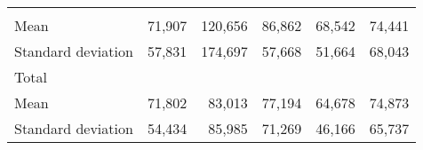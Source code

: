 \begin{tabular}{llllll}
  \multicolumn{1}{|r}{} &
  \multicolumn{1}{r}{} &
  \multicolumn{1}{r}{} &
  \multicolumn{1}{r}{} &
  \multicolumn{1}{r}{} \\
\multicolumn{1}{l}{\hspace{4em}Mean} &
  \multicolumn{1}{|r}{71,907} &
  \multicolumn{1}{r}{120,656} &
  \multicolumn{1}{r}{86,862} &
  \multicolumn{1}{r}{68,542} &
  \multicolumn{1}{r}{74,441} \\
\multicolumn{1}{l}{\hspace{4em}Standard deviation} &
  \multicolumn{1}{|r}{57,831} &
  \multicolumn{1}{r}{174,697} &
  \multicolumn{1}{r}{57,668} &
  \multicolumn{1}{r}{51,664} &
  \multicolumn{1}{r}{68,043} \\
\multicolumn{1}{l}{\hspace{3em}Total} &
  \multicolumn{1}{|r}{} &
  \multicolumn{1}{r}{} &
  \multicolumn{1}{r}{} &
  \multicolumn{1}{r}{} &
  \multicolumn{1}{r}{} \\
\multicolumn{1}{l}{\hspace{4em}Mean} &
  \multicolumn{1}{|r}{71,802} &
  \multicolumn{1}{r}{83,013} &
  \multicolumn{1}{r}{77,194} &
  \multicolumn{1}{r}{64,678} &
  \multicolumn{1}{r}{74,873} \\
\multicolumn{1}{l}{\hspace{4em}Standard deviation} &
  \multicolumn{1}{|r}{54,434} &
  \multicolumn{1}{r}{85,985} &
  \multicolumn{1}{r}{71,269} &
  \multicolumn{1}{r}{46,166} &
  \multicolumn{1}{r}{65,737} \\
\cline{1-6}
\end{tabular}

